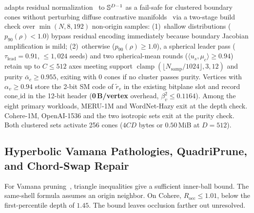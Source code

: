 \rquiver{} adapts residual normalization~\cite{jegou2011pq} to $\mathbb{S}^{D-1}$ as a fail-safe for clustered boundary cones without perturbing diffuse contrastive manifolds~\cite{wang2020understanding,betser2026infonce,xiao2026decisions} via a two-stage build check over $\min(N, 8{,}192)$ non-origin samples:
(1)~shallow distributions ($p_{90}(\rho) < 1.0$) bypass residual encoding immediately because boundary Jacobian amplification is mild;
(2)~otherwise ($p_{90}(\rho) \ge 1.0$), a spherical leader pass ($\tau_{\mathrm{lead}} = 0.91$, $\le 1{,}024$ seeds) and two spherical-mean rounds ($\langle u_s, \mu_c\rangle \ge 0.94$) retain up to $C \le 512$ axes meeting support $\operatorname{clamp}(\lfloor N_{\mathrm{samp}}/1024\rfloor, 3, 12)$ and purity $\bar{\alpha}_c \ge 0.955$, exiting with $0$ cones if no cluster passes purity.
Vertices with $\alpha_v \ge 0.94$ store the 2-bit {SM} code of $\tilde{r}_v$ in the existing bitplane slot and record $\text{cone\_id}$ in the 12-bit header (\textbf{0\,B/vertex} overhead, $\beta_v^2 \le 0.1164$).
Among the eight primary workloads, MERU-1M and WordNet-Hazy exit at the depth check. Cohere-1M, OpenAI-1536 and the two isotropic sets exit at the purity check. Both clustered sets activate 256 cones ($4CD$ bytes or $0.50$\,MiB at $D=512$).

\subsection{Hyperbolic Vamana Pathologies, QuadriPrune, and Chord-Swap Repair}
\label{subsec:compass}

For {Vamana} pruning~\cite{subramanya2019diskann}, triangle inequalities give a sufficient inner-ball bound. The same-shell formula assumes an origin neighbor. On Cohere, $R_{\mathrm{occ}}\le1.01$, below the first-percentile depth of $1.45$. The bound leaves occlusion farther out unresolved.

